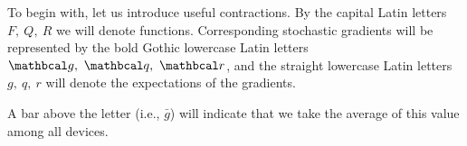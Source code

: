 $ $\par
To begin with, let us introduce useful contractions. 
By the capital Latin letters \( F, \ Q, \ R \) we will denote functions. 
Corresponding stochastic gradients will be represented by the bold Gothic lowercase Latin letters \( \mc{g}, \ \mc{q}, \ \mc{r} \), and the straight lowercase Latin letters \( g, \ q, \ r \) will denote the expectations of the gradients.

A bar above the letter (i.e., \( \bar{g} \)) will indicate that we take the average of this value among all devices.


